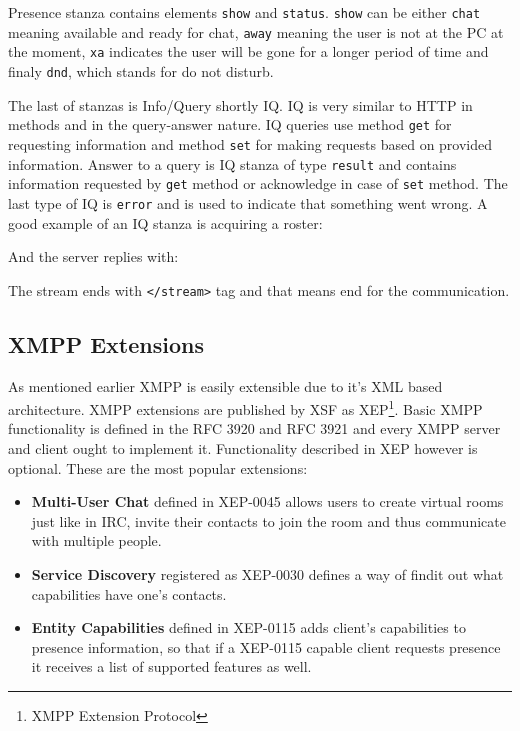 %

Presence stanza contains elements \verb|show| and \verb|status|. \verb|show| can be either \verb|chat| meaning available and ready for chat, \verb|away| meaning the user is not at the PC at the moment, \verb|xa| indicates the user will be gone for a longer period of time and finaly \verb|dnd|, which stands for do not disturb.  

The last of stanzas is Info/Query shortly IQ. IQ is very similar to HTTP in methods and in the query-answer nature. IQ queries use method \verb|get| for requesting information and method \verb|set| for making requests based on provided information. Answer to a query is IQ stanza of type \verb|result| and contains information requested by \verb|get| method or acknowledge in case of \verb|set| method. The last type of IQ is \verb|error| and is used to indicate that something went wrong. A good example of an IQ stanza is acquiring a roster: 

%

And the server replies with:

%

The stream ends with \verb|</stream>| tag and that means end for the communication. 

\subsection*{XMPP Extensions}
As mentioned earlier XMPP is easily extensible due to it's XML based architecture. XMPP extensions are published by XSF as XEP\footnote{XMPP Extension Protocol}. Basic XMPP functionality is defined in the RFC 3920 and RFC 3921 and every XMPP server and client ought to implement it. Functionality described in XEP however is optional. These are the most popular extensions:
\begin{itemize}
	\item{\bf Multi-User Chat} defined in XEP-0045 \cite{xepMUC} allows users to create virtual rooms just like in IRC, invite their contacts to join the room and thus communicate with multiple people.
	\item{\bf Service Discovery} registered as XEP-0030 \cite{xepServiceDiscovery} defines a way of findit out what capabilities have one's contacts.
	\item{\bf Entity Capabilities} defined in XEP-0115 \cite{xepCapabilitiesAdvertisement} adds client's capabilities to presence information, so that if a XEP-0115 capable client requests presence it receives a list of supported features as well.
\end{itemize}

